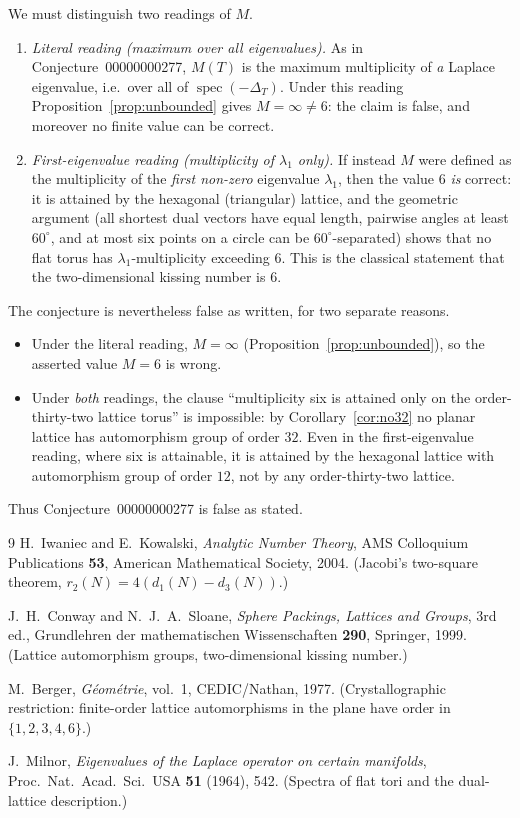 \documentclass[11pt]{article}
\theoremstyle{definition}
\theoremstyle{remark}
\newcommand{\rtwo}{r_2}
\begin{document}
We must distinguish two readings of $M$.

\begin{enumerate}
\item \emph{Literal reading (maximum over all eigenvalues).}  As in
Conjecture~00000000277, $M(T)$ is the maximum multiplicity of \emph{a}
Laplace eigenvalue, i.e.\ over all of $\operatorname{spec}(-\Delta_T)$.  Under
this reading Proposition~\ref{prop:unbounded} gives $M=\infty\neq6$: the claim
is false, and moreover no finite value can be correct.

\item \emph{First-eigenvalue reading (multiplicity of $\lambda_1$ only).}  If
instead $M$ were defined as the multiplicity of the \emph{first non-zero}
eigenvalue $\lambda_1$, then the value $6$ \emph{is} correct: it is attained by
the hexagonal (triangular) lattice, and the geometric argument (all shortest
dual vectors have equal length, pairwise angles at least $60^\circ$, and at
most six points on a circle can be $60^\circ$-separated) shows that no flat
torus has $\lambda_1$-multiplicity exceeding $6$.  This is the classical
statement that the two-dimensional kissing number is $6$.
\end{enumerate}

The conjecture is nevertheless false as written, for two separate reasons.

\begin{itemize}
\item Under the literal reading, $M=\infty$ (Proposition~\ref{prop:unbounded}),
so the asserted value $M=6$ is wrong.
\item Under \emph{both} readings, the clause ``multiplicity six is attained
only on the order-thirty-two lattice torus'' is impossible: by
Corollary~\ref{cor:no32} no planar lattice has automorphism group of order
$32$.  Even in the first-eigenvalue reading, where six is attainable, it is
attained by the hexagonal lattice with automorphism group of order $12$, not
by any order-thirty-two lattice.
\end{itemize}

Thus Conjecture~00000000277 is false as stated.

\begin{thebibliography}{9}
H.~Iwaniec and E.~Kowalski,
\emph{Analytic Number Theory}, AMS Colloquium Publications \textbf{53},
American Mathematical Society, 2004.  (Jacobi's two-square theorem,
$\rtwo(N)=4(d_1(N)-d_3(N))$.)

J.~H.~Conway and N.~J.~A.~Sloane,
\emph{Sphere Packings, Lattices and Groups}, 3rd ed., Grundlehren der
mathematischen Wissenschaften \textbf{290}, Springer, 1999.
(Lattice automorphism groups, two-dimensional kissing number.)

M.~Berger,
\emph{G\'eom\'etrie}, vol.~1, CEDIC/Nathan, 1977.
(Crystallographic restriction: finite-order lattice automorphisms in the
plane have order in $\{1,2,3,4,6\}$.)

J.~Milnor,
\emph{Eigenvalues of the Laplace operator on certain manifolds},
Proc.\ Nat.\ Acad.\ Sci.\ USA \textbf{51} (1964), 542.
(Spectra of flat tori and the dual-lattice description.)
\end{thebibliography}
\end{document}
